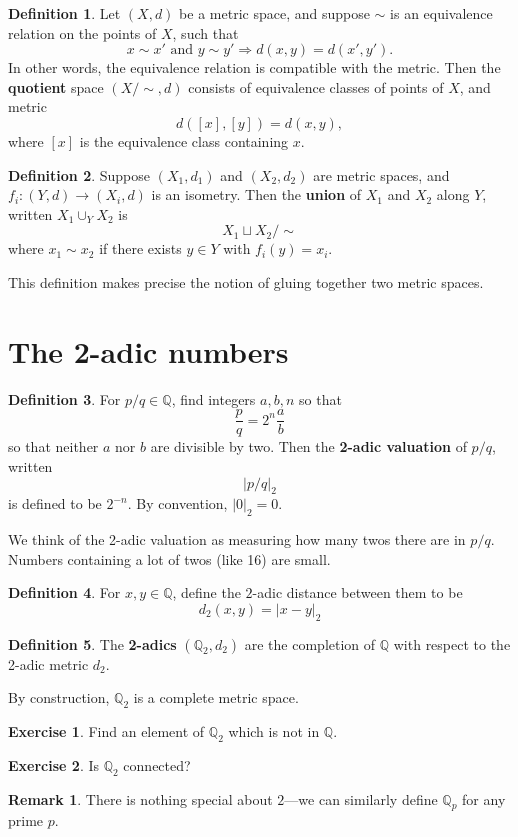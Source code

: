 \documentclass[12pt]{article}
\newcommand{\Q}{\mathbb{Q}}
\theoremstyle{plain}%
\theoremstyle{definition}
\newtheorem{definition}{Definition}[theorem]
\newtheorem{exercise}{Exercise}[theorem]
\newtheorem{remark}{Remark}[theorem]
\begin{document}
\begin{definition}
Let $(X,d)$ be a metric space, and suppose $\sim$ is an equivalence relation on the points of $X$, such that
$$
x \sim x' \mbox{ and } y \sim y' \Rightarrow d(x,y) = d(x',y').
$$
In other words, the equivalence relation is compatible with the metric.  Then the \textbf{quotient} space $(X/\sim, d)$ consists of equivalence classes of points of $X$, and metric
$$
d([x], [y]) = d(x,y),
$$
where $[x]$ is the equivalence class containing $x$.
\end{definition}

\begin{definition}
  Suppose $(X_1, d_1)$ and $(X_2, d_2)$ are metric spaces, and $f_i :
  (Y,d) \to (X_i,d)$ is an isometry.  Then the \textbf{union} of $X_1$
  and $X_2$ along $Y$, written $X_1 \cup_Y X_2$ is
$$
X_1 \sqcup X_2 / \sim
$$
where $x_1 \sim x_2$ if there exists $y \in Y$ with $f_i(y) = x_i$.
\end{definition}
This definition makes precise the notion of gluing together two metric spaces.

\section{The 2-adic numbers}

\begin{definition}
For $p/q \in \Q$, find integers $a, b, n$ so that
$$
\frac{p}{q} = 2^n \frac{a}{b}
$$
so that neither $a$ nor $b$ are divisible by two.  Then the \textbf{2-adic valuation} of $p/q$, written
$$
|p/q|_2
$$
is defined to be $2^{-n}$.  By convention, $|0|_2 = 0$.
\end{definition}
We think of the 2-adic valuation as measuring how many twos there are
in $p/q$.  Numbers containing a lot of twos (like 16) are small.

\begin{definition}
For $x, y \in \Q$, define the $2$-adic distance between them to be
$$
d_2(x,y) = |x-y|_2
$$
\end{definition}

\begin{definition}
The \textbf{2-adics} $(\Q_2,d_2)$ are the completion of $\Q$ with respect to the 2-adic metric $d_2$.
\end{definition}

By construction, $\Q_2$ is a complete metric space.

\begin{exercise}
Find an element of $\Q_2$ which is not in $\Q$.
\end{exercise}

\begin{exercise}
Is $\Q_2$ connected?
\end{exercise}

\begin{remark}
There is nothing special about $2$---we can similarly define $\Q_p$ for any prime $p$.
\end{remark}
\end{document}
